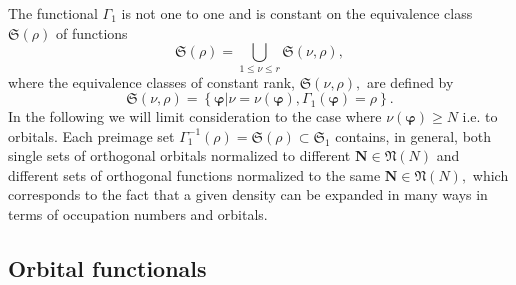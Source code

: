 \documentclass[aps,preprint]{revtex4}%
\begin{document}
The functional $\Gamma_{1}$ is not one to one and is constant on the
equivalence class $\mathfrak{S}\left(  \rho\right)  $ of functions%
\begin{equation}
\mathfrak{S}\left(  \rho\right)  =\bigcup\limits_{1\leq\nu\leq r}%
\mathfrak{S}\left(  \nu,\rho\right)  ,
\end{equation}
where the equivalence classes of constant rank, $\mathfrak{S}\left(  \nu
,\rho\right)  ,$ are defined by
\begin{equation}
\mathfrak{S}\left(  \nu,\rho\right)  =\left\{  \left.  \boldsymbol{\varphi
}\right\vert \nu=\nu\left(  \boldsymbol{\varphi}\right)  ,\Gamma_{1}\left(
\boldsymbol{\varphi}\right)  =\rho\right\}  .
\end{equation}
In the following we will limit consideration to the case where $\nu\left(
\boldsymbol{\varphi}\right)  \geq N$ i.e. to orbitals. Each preimage set
$\Gamma_{1}^{-1}\left(  \rho\right)  =\mathfrak{S}\left(  \rho\right)
\subset\mathfrak{S}_{1}$ contains, in general, both single sets of orthogonal
orbitals normalized to different $\boldsymbol{N}\in\mathfrak{N}\left(
N\right)  $ and different sets of orthogonal functions normalized to the same
$\boldsymbol{N}\in\mathfrak{N}\left(  N\right)  ,$ which corresponds to the
fact that a given density can be expanded in many ways in terms of occupation
numbers and orbitals.

\subsection{Orbital functionals\label{GSOFunc}}
\end{document}
